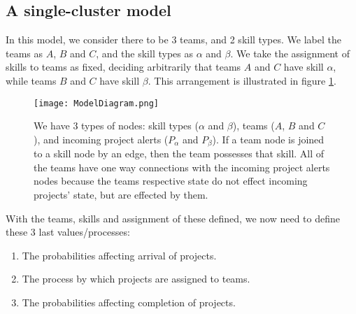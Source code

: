 \subsection{A single-cluster model}
In this model, we consider there to be 3 teams, and 2 skill types. We label the teams as $A$, $B$ and $C$, and the skill types as $\alpha$ and $\beta$. We take the assignment of skills to teams as fixed, deciding arbitrarily that teams $A$ and $C$ have skill $\alpha$, while teams $B$ and $C$ have skill $\beta$. This arrangement is illustrated in figure \ref{fig:diagram1}.

\begin{figure}[ht]
	\centering

	\texttt{[image: ModelDiagram.png]}
	\caption{We have 3 types of nodes: skill types ($\alpha$ and $\beta$), teams ($A$, $B$ and $C$), and incoming project alerts ($P_\alpha$ and $P_\beta$). If a team node is joined to a skill node by an edge, then the team possesses that skill. All of the teams have one way connections with the incoming project alerts nodes because the teams respective state do not effect incoming projects' state, but are effected by them.}
	\label{fig:diagram1}
\end{figure}

With the teams, skills and assignment of these defined, we now need to define these 3 last values/processes:

\begin{enumerate}
	\item The probabilities affecting arrival of projects.
	\item The process by which projects are assigned to teams.
	\item The probabilities affecting completion of projects.
\end{enumerate}

